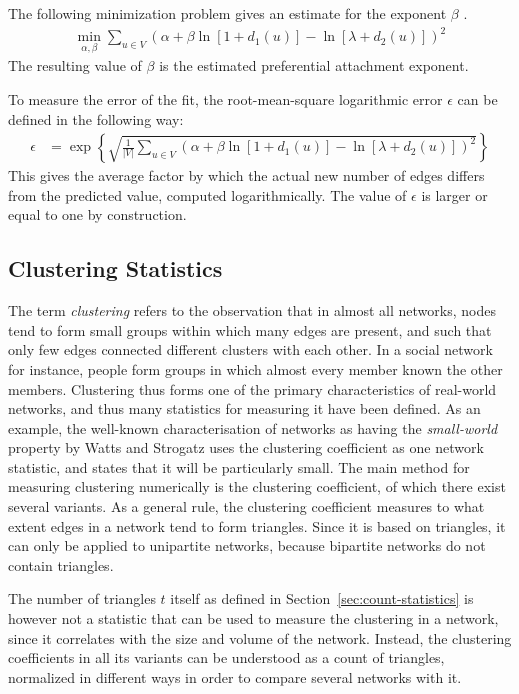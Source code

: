 \documentclass{article}
\begin{document}
The following minimization problem gives an estimate for the exponent
$\beta$ \citep{kunegis:preferential-attachment}.
\begin{align}
  \min_{\alpha,\beta} \sum_{u\in V} \left( \alpha + \beta \ln[1 + d_1(u)]
  - \ln[\lambda + d_2(u)]  \right)^2
  \label{eq:min}
\end{align}
The resulting value of $\beta$ is the estimated preferential attachment
exponent. 

To measure the error of the fit, the root-mean-square
logarithmic error $\epsilon$ can be defined in the following way: 
\begin{align*}
    \epsilon &= \exp\left\{ \sqrt{ \frac 1 {|V|} \sum_{u \in V}
      \left(\alpha + \beta \ln[1 
        + d_1(u)] - \ln[\lambda + d_2(u)]\right)^2  }  \right\}
\end{align*}
This gives the average factor by which the actual new number of edges
differs from the predicted value, computed logarithmically. 
The value of $\epsilon$ is larger or equal to one by construction. 

\subsection{Clustering Statistics}
\label{sec:statistic:clustering}
The term \emph{clustering} refers to the observation that in almost all
networks, nodes tend to form small groups within which many edges are
present, and such that only few edges connected different clusters with
each other.  In a social network for instance, people form groups in
which almost every member known the other members.  Clustering thus
forms one of the primary characteristics of real-world networks, and
thus many statistics for measuring it have been defined.  
As an example, the well-known characterisation of networks as having the
\emph{small-world} property by Watts and Strogatz \citeyearpar{b228}
uses the clustering coefficient as one network statistic, and states
that it will be particularly small. 
The main
method for measuring clustering numerically is the clustering
coefficient, of which there exist several variants. As a general rule,
the clustering coefficient measures to what extent edges in a network
tend to form triangles. Since it is based on triangles, it can only be
applied to unipartite networks, because bipartite networks do not
contain triangles.

The number of triangles $t$ itself as defined in
Section~\ref{sec:count-statistics} is however not a statistic that can
be used to measure the clustering in a network, since it correlates with
the size and volume of the network.  Instead, the clustering
coefficients in all its variants can be understood as a count of
triangles, normalized in different ways in order to compare several
networks with it.
\end{document}
